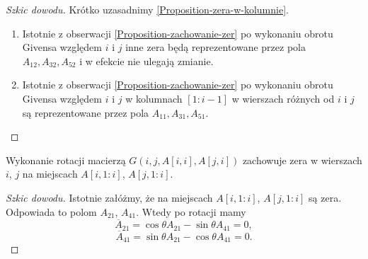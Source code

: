 \documentclass[12pt,a4paper]{report}
\newcommand{\mx}[1]{{#1}}
\begin{document}
\begin{proof}[Szkic dowodu]
Krótko uzasadnimy \ref{Proposition-zera-w-kolumnie}.
\begin{enumerate}
\item Istotnie z obserwacji \ref{Proposition-zachowanie-zer} po wykonaniu obrotu Givensa względem $i$ i $j$ inne zera będą reprezentowane przez pola $\mx{A}_{12}, \mx{A}_{32}, \mx{A}_{52}$ i w efekcie nie ulegają zmianie.
\item Istotnie z obserwacji \ref{Proposition-zachowanie-zer} po wykonaniu obrotu Givensa względem $i$ i $j$ w kolumnach $[1:i-1]$ w wierszach różnych od $i$ i $j$ są reprezentowane przez pola $\mx{A}_{11},\mx{A}_{31},\mx{A}_{51}$.
\end{enumerate}
\end{proof}



\begin{proposition}\label{Proposition-zera-w-wierszach}
Wykonanie rotacji macierzą $\mx{G}(i,j, \mx{A}[i,i], \mx{A}[j,i])$ zachowuje zera w wierszach $i$, $j$ na miejscach $\mx{A}[i,1:i]$, $\mx{A}[j, 1:i]$. 
\end{proposition}
\begin{proof}[Szkic dowodu]

Istotnie załóżmy, że na miejscach $\mx{A}[i,1:i]$, $\mx{A}[j, 1:i]$ są zera. Odpowiada to polom $\mx{A}_{21}$, $\mx{A}_{41}$. Wtedy po rotacji mamy 
$$
\overline{\mx{A}}_{21} = \cos\theta\mx{A}_{21} - \sin\theta\mx{A}_{41} = 0,
$$  
$$
\overline{\mx{A}}_{41} = \sin\theta\mx{A}_{21} - \cos\theta\mx{A}_{41} = 0.
$$
\end{proof}
\end{document}
